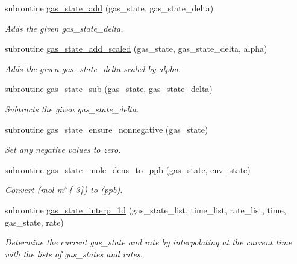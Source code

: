 \begin{DoxyCompactItemize}
subroutine \mbox{\hyperlink{namespacepmc__gas__state_ae81c12f010adf0cbed8104e5f7ecfca0}{gas\+\_\+state\+\_\+add}} (gas\+\_\+state, gas\+\_\+state\+\_\+delta)
\begin{DoxyCompactList}\small\item\em Adds the given gas\+\_\+state\+\_\+delta. \end{DoxyCompactList}\item 
subroutine \mbox{\hyperlink{namespacepmc__gas__state_aad52ea70d41084b337a37173e58e1c4a}{gas\+\_\+state\+\_\+add\+\_\+scaled}} (gas\+\_\+state, gas\+\_\+state\+\_\+delta, alpha)
\begin{DoxyCompactList}\small\item\em Adds the given {\ttfamily gas\+\_\+state\+\_\+delta} scaled by {\ttfamily alpha}. \end{DoxyCompactList}\item 
subroutine \mbox{\hyperlink{namespacepmc__gas__state_a0ee905bb7dd2b8e8a576ea04e0f7b699}{gas\+\_\+state\+\_\+sub}} (gas\+\_\+state, gas\+\_\+state\+\_\+delta)
\begin{DoxyCompactList}\small\item\em Subtracts the given gas\+\_\+state\+\_\+delta. \end{DoxyCompactList}\item 
subroutine \mbox{\hyperlink{namespacepmc__gas__state_a19baf5dd776198d429d632a7749e734f}{gas\+\_\+state\+\_\+ensure\+\_\+nonnegative}} (gas\+\_\+state)
\begin{DoxyCompactList}\small\item\em Set any negative values to zero. \end{DoxyCompactList}\item 
subroutine \mbox{\hyperlink{namespacepmc__gas__state_a418fa0d971e5c3f84a8f7f90b1da4ac7}{gas\+\_\+state\+\_\+mole\+\_\+dens\+\_\+to\+\_\+ppb}} (gas\+\_\+state, env\+\_\+state)
\begin{DoxyCompactList}\small\item\em Convert (mol m$^\wedge$\{-\/3\}) to (ppb). \end{DoxyCompactList}\item 
subroutine \mbox{\hyperlink{namespacepmc__gas__state_ab70d882ec5ebc99127b4e815278cb15a}{gas\+\_\+state\+\_\+interp\+\_\+1d}} (gas\+\_\+state\+\_\+list, time\+\_\+list, rate\+\_\+list, time, gas\+\_\+state, rate)
\begin{DoxyCompactList}\small\item\em Determine the current gas\+\_\+state and rate by interpolating at the current time with the lists of gas\+\_\+states and rates. \end{DoxyCompactList}\item 

\end{DoxyCompactItemize}
